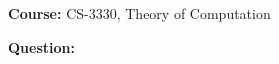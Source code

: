 
\maketitle

\noindent
\textbf{Course:} CS-3330, Theory of Computation

\vspace{0.2cm}

\noindent
\textbf{Question:}\noindent 